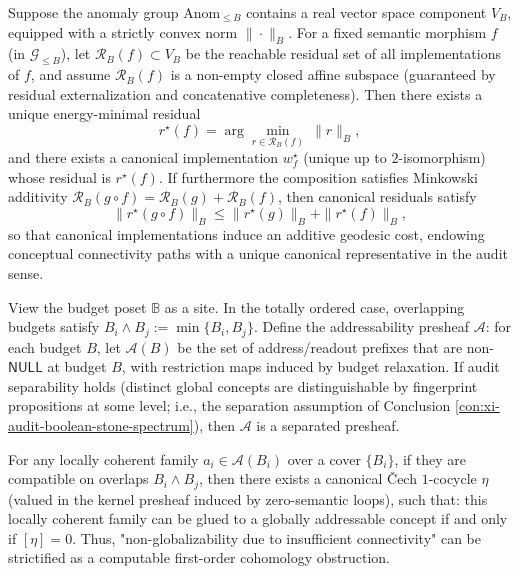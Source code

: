 \begin{conclusion}\label{con:xi-strict-convex-energy-canonical-word-geodesic}
Suppose the anomaly group \(\mathrm{Anom}_{\le B}\) contains a real vector space component \(V_B\), equipped with a strictly convex norm \(\|\cdot\|_B\).
For a fixed semantic morphism \(f\) (in \(\mathcal{G}_{\le B}\)), let \(\mathcal{R}_B(f)\subset V_B\) be the reachable residual set of all implementations of \(f\), and assume \(\mathcal{R}_B(f)\) is a non-empty closed affine subspace (guaranteed by residual externalization and concatenative completeness).
Then there exists a unique energy-minimal residual
\[
r^\star(f)=\arg\min_{r\in\mathcal{R}_B(f)}\ \|r\|_B,
\]
and there exists a canonical implementation \(w_f^\star\) (unique up to \(2\)-isomorphism) whose residual is \(r^\star(f)\).
If furthermore the composition satisfies Minkowski additivity
\(
\mathcal{R}_B(g\circ f)=\mathcal{R}_B(g)+\mathcal{R}_B(f)
\),
then canonical residuals satisfy
\[
\|r^\star(g\circ f)\|_B\le \|r^\star(g)\|_B+\|r^\star(f)\|_B,
\]
so that canonical implementations induce an additive geodesic cost, endowing conceptual connectivity paths with a unique canonical representative in the audit sense.
\end{conclusion}

\begin{conclusion}\label{con:xi-addressability-presheaf-gluing-h1-obstruction}
View the budget poset \(\mathbb{B}\) as a site.
In the totally ordered case, overlapping budgets satisfy \(B_i\wedge B_j:=\min\{B_i,B_j\}\).
Define the addressability presheaf \(\mathcal{A}\): for each budget \(B\), let \(\mathcal{A}(B)\) be the set of address/readout prefixes that are non-\(\mathsf{NULL}\) at budget \(B\), with restriction maps induced by budget relaxation.
If audit separability holds (distinct global concepts are distinguishable by fingerprint propositions at some level; i.e., the separation assumption of Conclusion \ref{con:xi-audit-boolean-stone-spectrum}), then \(\mathcal{A}\) is a separated presheaf.

For any locally coherent family \(a_i\in\mathcal{A}(B_i)\) over a cover \(\{B_i\}\), if they are compatible on overlaps \(B_i\wedge B_j\), then there exists a canonical \v{C}ech \(1\)-cocycle \(\eta\) (valued in the kernel presheaf induced by zero-semantic loops), such that: this locally coherent family can be glued to a globally addressable concept if and only if \([\eta]=0\).
Thus, "non-globalizability due to insufficient connectivity" can be strictified as a computable first-order cohomology obstruction.
\end{conclusion}

